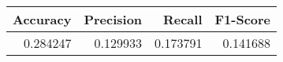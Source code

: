 \begin{tabular}{rrrr}
\toprule
 Accuracy &  Precision &   Recall &  F1-Score \\
\midrule
 0.284247 &   0.129933 & 0.173791 &  0.141688 \\
\bottomrule
\end{tabular}
